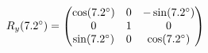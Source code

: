 \documentclass[preview]{standalone}
\begin{document}
\begin{align*}
\special{dvisvgm:raw <g id='unique000'>}R_y(7.2^\circ) = \begin{pmatrix} \cos(7.2^\circ) & 0 & -\sin(7.2^\circ) \\ 0 & 1 & 0 \\ \sin(7.2^\circ) & 0 & \cos(7.2^\circ) \end{pmatrix}\special{dvisvgm:raw </g>}
\end{align*}
\end{document}
